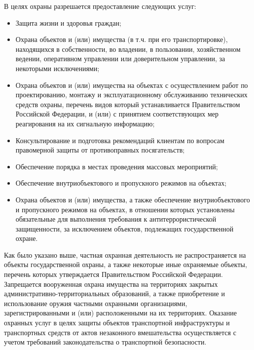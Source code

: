 \documentclass[a4paper,12pt,fleqn]{article} %
\begin{document}
В целях охраны разрешается предоставление следующих услуг:
\begin{itemize}
	\item Защита жизни и здоровья граждан;
	\item Охрана объектов и (или) имущества (в т.ч. при его транспортировке), находящихся в собственности, во владении, в пользовании, хозяйственном ведении, оперативном управлении или доверительном управлении, за некоторыми исключениями;
	\item Охрана объектов и (или) имущества на объектах с осуществлением работ по проектированию, монтажу и эксплуатационному обслуживанию технических средств охраны, перечень видов который устанавливается Правительством Российской Федерации, и (или) с принятием соответствующих мер реагирования на их сигнальную информацию;
	\item Консультирование и подготовка рекомендаций клиентам по вопросам правомерной защиты от противоправных посягательств;
	\item Обеспечение порядка в местах проведения массовых мероприятий;
	\item Обеспечение внутриобъектового и пропускного режимов на объектах;
	\item Охрана объектов и (или) имущества, а также обеспечение внутриобъектового и пропускного режимов на объектах, в отношении которых установлены обязательные для выполнения требования к антитеррористической защищенности, за исключением объектов, подлежащих государственной охране.
\end{itemize}

Как было указано выше, частная охранная деятельность не распространяется на объекты государственной охраны, а также некоторые иные охраняемые объекты, перечень которых утверждается Правительством Российской Федерации. Запрещается вооруженная охрана имущества на территориях закрытых административно-территориальных образований, а также приобретение и использование оружия частными охранными организациями, зарегистрированными и (или) расположенными на их территориях. Оказание охранных услуг в целях защиты объектов транспортной инфраструктуры и транспортных средств от актов незаконного вмешательства осуществляется с учетом требований законодательства о транспортной безопасности.
\end{document}
